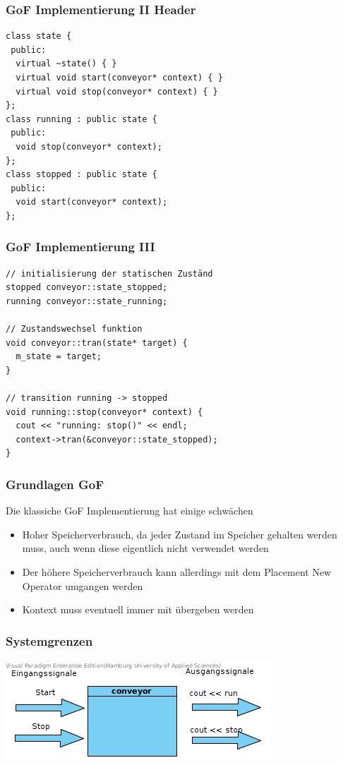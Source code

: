 \documentclass{beamer}
\begin{document}
\begin{frame}[fragile]
 \frametitle{GoF Implementierung II Header}
 \begin{lstlisting}
class state {
 public:
  virtual ~state() { }
  virtual void start(conveyor* context) { }
  virtual void stop(conveyor* context) { }
};
class running : public state {
 public:
  void stop(conveyor* context);
};
class stopped : public state {
 public:
  void start(conveyor* context);
};
 \end{lstlisting}
\end{frame}

\begin{frame}[fragile]
 \frametitle{GoF Implementierung III}
 \begin{lstlisting}
// initialisierung der statischen Zuständ
stopped conveyor::state_stopped;
running conveyor::state_running;

// Zustandswechsel funktion
void conveyor::tran(state* target) {
  m_state = target;
}

// transition running -> stopped
void running::stop(conveyor* context) {
  cout << "running: stop()" << endl;
  context->tran(&conveyor::state_stopped);
}
 \end{lstlisting}
\end{frame}


\begin{frame}
 \frametitle{Grundlagen GoF}
 Die klassiche GoF Implementierung hat einige schw\"achen
 \begin{itemize}
  \item Hoher Speicherverbrauch, da jeder Zustand im Speicher gehalten werden muss, auch wenn diese eigentlich nicht verwendet werden
  \item Der h\"ohere Speicherverbrauch kann allerdings mit dem Placement New Operator umgangen werden
  \item Kontext muss eventuell immer mit \"ubergeben werden
 \end{itemize}
\end{frame}

\begin{frame}
 \frametitle{Systemgrenzen}
 \includegraphics[scale=.7]{img/Systemgrenzen_fsm_gof.jpg}
\end{frame}
\end{document}
